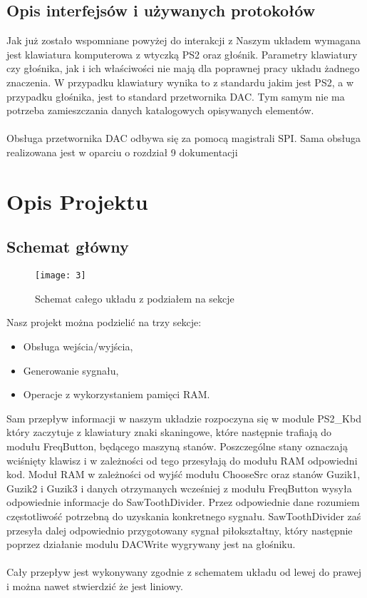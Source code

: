 \documentclass[11pt]{article}
\begin{document}
	
	\subsection{Opis interfejsów i używanych protokołów}
	Jak już zostało wspomniane powyżej do interakcji z Naszym układem wymagana jest klawiatura komputerowa z wtyczką PS2 oraz głośnik. Parametry klawiatury czy głośnika, jak i ich właściwości nie mają dla poprawnej pracy układu żadnego znaczenia. W przypadku klawiatury wynika to z standardu jakim jest PS2, a w przypadku głośnika, jest to standard przetwornika DAC. Tym samym nie ma potrzeba zamieszczania danych katalogowych opisywanych elementów.\\\\Obsługa przetwornika DAC odbywa się za pomocą magistrali SPI. Sama obsługa realizowana jest w oparciu o rozdział 9 dokumentacji \cite{1}

	\section{Opis Projektu}
	\subsection{Schemat główny}
	
\begin{figure}
	\centering
	\texttt{[image: 3]}
	\caption{Schemat całego układu z podziałem na sekcje}
	\label{fig:1}
\end{figure}
	
	
	Nasz projekt można podzielić na trzy sekcje:
	\begin{itemize}[noitemsep]
		\item Obsługa wejścia/wyjścia,
		\item Generowanie sygnału,
		\item Operacje z wykorzystaniem pamięci RAM.
	\end{itemize}

	Sam przepływ informacji w naszym układzie rozpoczyna się w module PS2\_Kbd który zaczytuje z klawiatury znaki skaningowe, które następnie trafiają do modułu FreqButton, będącego maszyną stanów. Poszczególne stany oznaczają wciśnięty klawisz i w zależności od tego przesyłają do modułu RAM odpowiedni kod. Moduł RAM w zależności od wyjść modułu ChooseSrc oraz stanów Guzik1, Guzik2 i Guzik3 i danych otrzymanych wcześniej z modułu FreqButton wysyła odpowiednie informacje do SawToothDivider. Przez odpowiednie dane rozumiem częstotliwość potrzebną do uzyskania konkretnego sygnału. SawToothDivider zaś przesyła dalej odpowiednio przygotowany sygnał piłokształtny, który następnie poprzez działanie modulu DACWrite wygrywany jest na głośniku.\\\\Cały przepływ jest wykonywany zgodnie z schematem układu od lewej do prawej i można nawet stwierdzić że jest liniowy.
		
\end{document}
